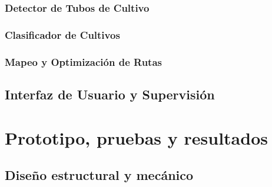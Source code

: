\documentclass[a4paper,12pt]{report}
\begin{document}
\subsection{Detector de Tubos de Cultivo}




\subsection{Clasificador de Cultivos}



\subsection{Mapeo y Optimización de Rutas}



\section{Interfaz de Usuario y Supervisión}






%
%
%
%

\chapter{Prototipo, pruebas y resultados}
\section{Diseño estructural y mecánico}




%
%
\end{document}
